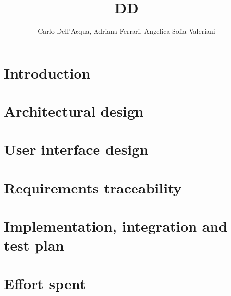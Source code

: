 \documentclass[a4paper]{report}
\title{DD}
\author{Carlo Dell'Acqua, Adriana Ferrari, Angelica Sofia Valeriani}
\begin{document}
  \maketitle

  \tableofcontents

  \chapter{Introduction}
  

  \chapter{Architectural design}
  

  \chapter{User interface design}
  
  
  \chapter{Requirements traceability}
  

  \chapter{Implementation, integration and test plan}
  
  
  \chapter{Effort spent}
  

  \begin{thebibliography}{0}
  \end{thebibliography}
\end{document}

